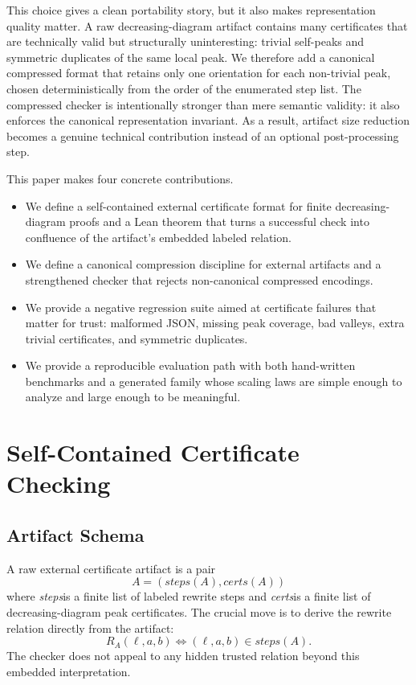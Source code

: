 \documentclass[submission,copyright,creativecommons]{eptcs}
\newcommand{\lean}{Lean\xspace}
\newcommand{\steps}{\textit{steps}}
\newcommand{\certs}{\textit{certs}}
\begin{document}
This choice gives a clean portability story, but it also makes representation
quality matter. A raw decreasing-diagram artifact contains many certificates
that are technically valid but structurally uninteresting: trivial self-peaks
and symmetric duplicates of the same local peak. We therefore add a canonical
compressed format that retains only one orientation for each non-trivial peak,
chosen deterministically from the order of the enumerated step list. The
compressed checker is intentionally stronger than mere semantic validity: it
also enforces the canonical representation invariant. As a result, artifact size
reduction becomes a genuine technical contribution instead of an optional
post-processing step.

This paper makes four concrete contributions.
\begin{itemize}
\item We define a self-contained external certificate format for finite
  decreasing-diagram proofs and a \lean theorem that turns a successful check
  into confluence of the artifact's embedded labeled relation.
\item We define a canonical compression discipline for external artifacts and a
  strengthened checker that rejects non-canonical compressed encodings.
\item We provide a negative regression suite aimed at certificate failures that
  matter for trust: malformed JSON, missing peak coverage, bad valleys, extra
  trivial certificates, and symmetric duplicates.
\item We provide a reproducible evaluation path with both hand-written
  benchmarks and a generated family whose scaling laws are simple enough to
  analyze and large enough to be meaningful.
\end{itemize}

\section{Self-Contained Certificate Checking}

\subsection{Artifact Schema}

A raw external certificate artifact is a pair
\[
  A = (\steps(A), \certs(A))
\]
where \steps is a finite list of labeled rewrite steps and \certs is a finite
list of decreasing-diagram peak certificates. The crucial move is to derive the
rewrite relation directly from the artifact:
\[
  R_A(\ell,a,b) \iff (\ell,a,b) \in \steps(A).
\]
The checker does not appeal to any hidden trusted relation beyond this embedded
interpretation.
\end{document}
